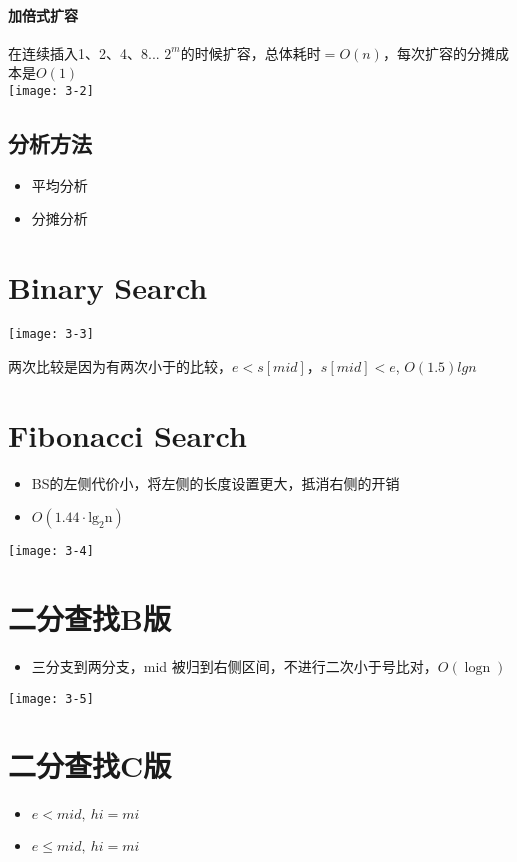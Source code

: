\paragraph{加倍式扩容}
在连续插入1、2、4、8... $2^m$的时候扩容，总体耗时$=O(n)$，每次扩容的分摊成本是$O(1)$\\
\texttt{[image: 3-2]}

\subsection{分析方法}
\begin{itemize}
\item 平均分析
\item 分摊分析
\end{itemize}

\section{Binary Search}
\texttt{[image: 3-3]}

两次比较是因为有两次小于的比较，$e < s[mid]$，$s[mid] < e$, $O(1.5)lg n$

\section{Fibonacci Search}
\begin{itemize}
\item BS的左侧代价小，将左侧的长度设置更大，抵消右侧的开销
\item $O\left(1.44 \cdot \mathrm{lg}_{2} \mathrm{n}\right)$
\end{itemize}

\texttt{[image: 3-4]}

\section{二分查找B版}
\begin{itemize}
\item 三分支到两分支，mid 被归到右侧区间，不进行二次小于号比对，$O(\operatorname{logn})$
\end{itemize}
\texttt{[image: 3-5]}

\section{二分查找C版}
\begin{itemize}
    \item $e < mid,\ hi = mi$
    \item $e \leq mid,\ hi = mi$
\end{itemize}

